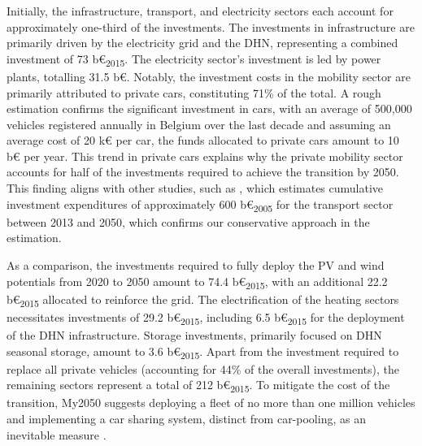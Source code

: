 Initially, the infrastructure, transport, and electricity sectors each account for approximately one-third of the investments. The investments in infrastructure are primarily driven by the electricity grid and the \acrfull{DHN}, representing a combined investment of 73 b€\textsubscript{2015}. The electricity sector's investment is led by power plants, totalling 31.5 b€. Notably, the investment costs in the mobility sector are primarily attributed to private cars, constituting 71\% of the total. A rough estimation confirms the significant investment in cars, with an average of 500,000 vehicles registered annually in Belgium over the last decade \cite{febiac2021datadigest} and assuming an average cost of 20 k€ per car, the funds allocated to private cars amount to 10 b€ per year. This trend in private cars explains why the private mobility sector accounts for half of the investments required to achieve the transition by 2050. This finding aligns with other studies, such as \citet{Devogelaer2013}, which estimates cumulative investment expenditures of approximately 600 b€\textsubscript{2005} for the transport sector between 2013 and 2050, which confirms our conservative approach in the estimation.


As a comparison, the investments required to fully deploy the PV and wind potentials from 2020 to 2050 amount to 74.4 b€\textsubscript{2015}, with an additional 22.2 b€\textsubscript{2015} allocated to reinforce the grid. The electrification of the heating sectors necessitates investments of 29.2 b€\textsubscript{2015}, including 6.5 b€\textsubscript{2015} for the deployment of the \gls{DHN} infrastructure. Storage investments, primarily focused on \gls{DHN} seasonal storage, amount to 3.6 b€\textsubscript{2015}. Apart from the investment required to replace all private vehicles (accounting for 44\% of the overall investments), the remaining sectors represent a total of 212 b€\textsubscript{2015}. To mitigate the cost of the transition, My2050 suggests deploying a fleet of no more than one million vehicles and implementing a car sharing system, distinct from car-pooling, as an inevitable measure \cite{My2050}.




